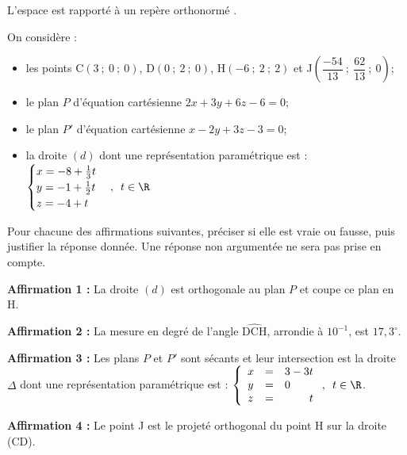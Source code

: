 \medskip
L'espace est rapporté à un repère orthonormé \Oijk.

On considère :

\begin{itemize}
\item les points C$(3~;~0~;~0)$, D$(0~;~2~;~0)$, H$(-6~;~2~;~2)$ et J$\left(\dfrac{-54}{13}~;~\dfrac{62}{13}~;~0\right)$;
\item le plan $P$ d'équation cartésienne $2 x+3 y+ 6 z-6 = 0$;
\item le plan $P'$ d'équation cartésienne $x - 2 y + 3 z - 3 = 0$;
\item la droite $(d)$ dont une représentation paramétrique est : $\begin{cases}x=- 8+\frac{1}{3} t \\ y = -1+\frac{1}{2} t \\ z=-4+t\end{cases}, \enskip t \in \R$
\end{itemize}

Pour chacune des affirmations suivantes, préciser si elle est vraie ou fausse, puis justifier la réponse donnée. Une réponse non argumentée ne sera pas prise en compte.

\medskip

\textbf{Affirmation 1 : } La droite $(d)$ est orthogonale au plan $P$ et coupe ce plan en H.

\medskip

\textbf{Affirmation 2 : } La mesure en degré de l'angle $\widehat{\mathrm{D C H}}$, arrondie à $10^{-1}$, est $17,3^{\circ}$.

\medskip

\textbf{Affirmation 3 : } Les plans $P$ et $P'$ sont sécants et leur intersection est la droite $\Delta$ dont une représentation paramétrique est : $\left\{\begin{array}{l c l}x&=&3-3 t \\ y&=&0 \\ z&=&\phantom{3- 3}t\end{array}\right.,\enskip t \in \R$.
\medskip

\textbf{Affirmation 4 : } Le point J est le projeté orthogonal du point H sur la droite (CD).

\medskip
